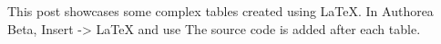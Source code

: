 This post showcases some complex tables created using LaTeX. In Authorea Beta, Insert -> LaTeX and use The source code is added after each table.

\newline